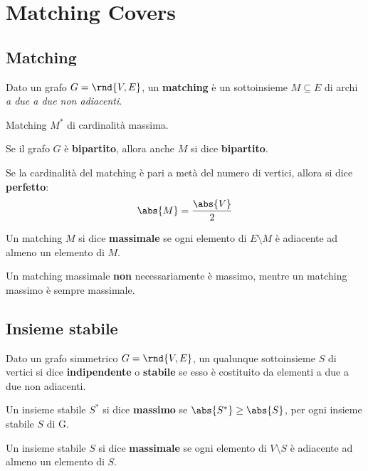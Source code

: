 \documentclass[\main/main.tex]{subfiles}
\begin{document}
\chapter{Matching Covers}

\section{Matching}
\setlength\columnsep{25pt}
\begin{multicols}{2}
	\begin{definition}
		Dato un grafo \(G=\rnd{V, E}\), un \textbf{matching} è un sottoinsieme \(M\subseteq E\) di archi \textit{a due a due non adiacenti}.
	\end{definition}
	\begin{definition}
		Matching \(M^*\) di cardinalità massima.
	\end{definition}
	\begin{definition}
		Se il grafo \(G\) è \textbf{bipartito}, allora anche \(M\) si dice \textbf{bipartito}.
	\end{definition}
	\begin{definition}
		Se la cardinalità del matching è pari a metà del numero di vertici, allora si dice \textbf{perfetto}:
		\[
			\abs{M} = \frac{\abs{V}}{2}
		\]
	\end{definition}
	\begin{definition}
		Un matching \(M\) si dice \textbf{massimale} se ogni elemento di \(E\setminus M\) è adiacente ad almeno un elemento di \(M\).

		Un matching massimale \textbf{non} necessariamente è massimo, mentre un matching massimo è sempre massimale.
	\end{definition}
\end{multicols}

\section{Insieme stabile}
\begin{definition}
	Dato un grafo simmetrico \(G=\rnd{V, E}\), un qualunque sottoinsieme \(S\) di vertici si dice \textbf{indipendente} o \textbf{stabile} se esso è costituito da elementi a due a due non adiacenti.
\end{definition}
\begin{definition}
	Un insieme stabile \(S^*\) si dice \textbf{massimo} se \(\abs{S^*} \geq \abs{S}\), per ogni insieme stabile \(S\) di G.
\end{definition}
\begin{definition}
	Un insieme stabile \(S\) si dice \textbf{massimale} se ogni elemento di \(V\setminus S\) è adiacente ad almeno un elemento di \(S\).
\end{definition}
\end{document}
